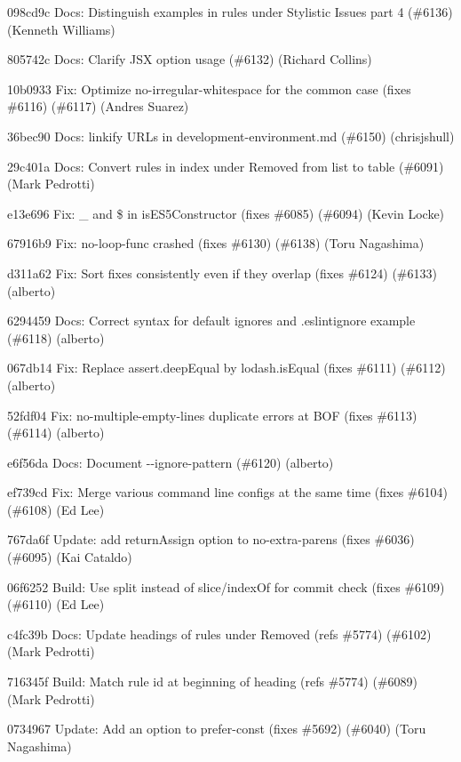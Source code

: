 \begin{DoxyItemize}
\item 098cd9c Docs\+: Distinguish examples in rules under Stylistic Issues part 4 (\#6136) (Kenneth Williams)
\item 805742c Docs\+: Clarify J\+SX option usage (\#6132) (Richard Collins)
\item 10b0933 Fix\+: Optimize no-\/irregular-\/whitespace for the common case (fixes \#6116) (\#6117) (Andres Suarez)
\item 36bec90 Docs\+: linkify U\+R\+Ls in development-\/environment.\+md (\#6150) (chrisjshull)
\item 29c401a Docs\+: Convert rules in index under Removed from list to table (\#6091) (Mark Pedrotti)
\item e13e696 Fix\+: {\ttfamily \+\_\+} and {\ttfamily \$} in is\+E\+S5\+Constructor (fixes \#6085) (\#6094) (Kevin Locke)
\item 67916b9 Fix\+: {\ttfamily no-\/loop-\/func} crashed (fixes \#6130) (\#6138) (Toru Nagashima)
\item d311a62 Fix\+: Sort fixes consistently even if they overlap (fixes \#6124) (\#6133) (alberto)
\item 6294459 Docs\+: Correct syntax for default ignores and {\ttfamily .eslintignore} example (\#6118) (alberto)
\item 067db14 Fix\+: Replace {\ttfamily assert.\+deep\+Equal} by {\ttfamily lodash.\+is\+Equal} (fixes \#6111) (\#6112) (alberto)
\item 52fdf04 Fix\+: {\ttfamily no-\/multiple-\/empty-\/lines} duplicate errors at B\+OF (fixes \#6113) (\#6114) (alberto)
\item e6f56da Docs\+: Document {\ttfamily -\/-\/ignore-\/pattern} (\#6120) (alberto)
\item ef739cd Fix\+: Merge various command line configs at the same time (fixes \#6104) (\#6108) (Ed Lee)
\item 767da6f Update\+: add return\+Assign option to no-\/extra-\/parens (fixes \#6036) (\#6095) (Kai Cataldo)
\item 06f6252 Build\+: Use split instead of slice/index\+Of for commit check (fixes \#6109) (\#6110) (Ed Lee)
\item c4fc39b Docs\+: Update headings of rules under Removed (refs \#5774) (\#6102) (Mark Pedrotti)
\item 716345f Build\+: Match rule id at beginning of heading (refs \#5774) (\#6089) (Mark Pedrotti)
\item 0734967 Update\+: Add an option to {\ttfamily prefer-\/const} (fixes \#5692) (\#6040) (Toru Nagashima)

\end{DoxyItemize}
